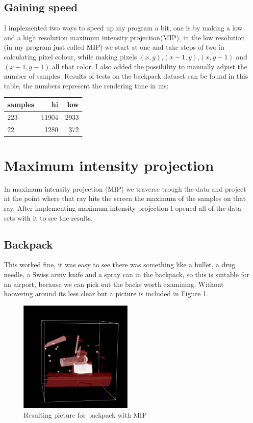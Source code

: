 \documentclass[a4paper,twoside,11pt]{article}
\begin{document}
\subsection{Gaining speed}
I implemented two ways to speed up my program a bit, one is by making a low and a high resolution maximum intensity projection(MIP), in the low resolution (in my program just called MIP) we start at one and take steps of two in calculating pixel colour, while making pixels $(x,y)$,$(x-1,y)$,$(x,y-1)$ and $(x-1,y-1)$ all that color. I also added the possibility to manually adjust the number of samples. Results of tests on the backpack dataset can be found in this table, the numbers represent the rendering time in ms:
\begin{center}
  \begin{tabular}{| l || r | r | }
    \hline
    samples & hi & low \\ \hline
    223 & 11904 & 2933 \\ \hline
    22 & 1280 & 372 \\
    \hline
  \end{tabular}
\end{center}

\section{Maximum intensity projection}
In maximum intensity projection (MIP) we traverse trough the data and project at the point where that ray hits the screen the maximum of the samples on that ray. After implementing maximum intensity projection I opened all of the data sets with it to see the results.
\subsection{Backpack}
This worked fine, it was easy to see there was something like a bullet, a drug needle, a Swiss army knife and a spray can in the backpack, so this is suitable for an airport, because we can pick out the backs worth examining. Without hoovering around its less clear but a picture is included in Figure \ref{MB}.
\begin{figure}[!h]
  \centering
  \includegraphics[width=0.5\textwidth]{MB.png}
  \caption{Resulting picture for backpack with MIP}
  \label{MB}
\end{figure}
\end{document}
